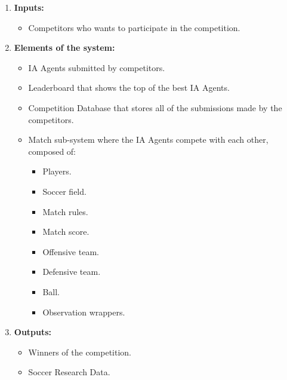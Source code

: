 \begin{enumerate}

    \item \textbf{Inputs:}
    \begin{itemize}
        \item Competitors who wants to participate in the competition.
    \end{itemize}

    \item \textbf{Elements of the system:}
    \begin{itemize}
        \item IA Agents submitted by competitors.
        \item Leaderboard that shows the top of the best IA Agents.
        \item Competition Database that stores all of the submissions made by the competitors.
        \item Match sub-system where the IA Agents compete with each other, composed of:
        \begin{itemize}
            \item Players.
            \item Soccer field.
            \item Match rules.
            \item Match score.
            \item Offensive team.
            \item Defensive team.
            \item Ball.
            \item Observation wrappers.
        \end{itemize}
    \end{itemize}

    \item \textbf{Outputs:}
    \begin{itemize}
        \item Winners of the competition.
        \item Soccer Research Data.
    \end{itemize}
\end{enumerate}

